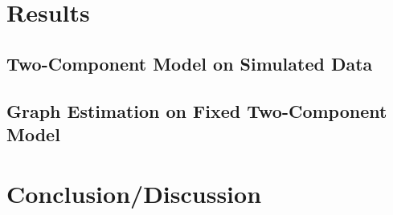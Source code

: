 \documentclass[]{article}
\numberwithin{equation}{section}
\begin{document}
\hypertarget{results}{%
\section{Results}\label{results}}

\hypertarget{two-component-model-on-simulated-data}{%
\subsection{Two-Component Model on Simulated
Data}\label{two-component-model-on-simulated-data}}

\hypertarget{graph-estimation-on-fixed-two-component-model}{%
\subsection{Graph Estimation on Fixed Two-Component
Model}\label{graph-estimation-on-fixed-two-component-model}}

\hypertarget{conclusiondiscussion}{%
\section{Conclusion/Discussion}\label{conclusiondiscussion}}



 
\end{document}
